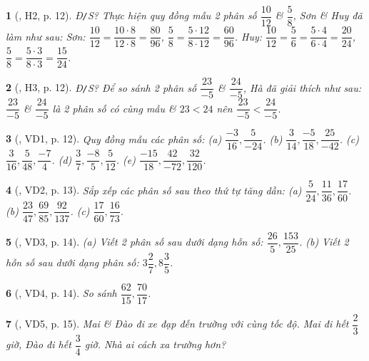 \documentclass{article}
\newtheorem{baitoan}{}
\begin{document}
\begin{baitoan}[\cite{Binh_boi_duong_Toan_6_tap_2}, H2, p. 12]
	{\rm Đ{\tt/}S?} Thực hiện quy đồng mẫu 2 phân số $\dfrac{10}{12}$ \& $\dfrac{5}{8}$, Sơn \& Huy đã làm như sau: Sơn: $\dfrac{10}{12} = \dfrac{10\cdot8}{12\cdot8} = \dfrac{80}{96}$, $\dfrac{5}{8} = \dfrac{5\cdot12}{8\cdot12} = \dfrac{60}{96}$. Huy: $\dfrac{10}{12} = \dfrac{5}{6} = \dfrac{5\cdot4}{6\cdot4} = \dfrac{20}{24}$, $\dfrac{5}{8} = \dfrac{5\cdot3}{8\cdot3} = \dfrac{15}{24}$.
\end{baitoan}

\begin{baitoan}[\cite{Binh_boi_duong_Toan_6_tap_2}, H3, p. 12]
	{\rm Đ{\tt/}S?} Để so sánh 2 phân số $\dfrac{23}{-5}$ \&  $\dfrac{24}{-5}$, Hà đã giải thích như sau: $\dfrac{23}{-5}$ \&  $\dfrac{24}{-5}$ là 2 phân số có cùng mẫu \& $23 < 24$ nên $\dfrac{23}{-5} < \dfrac{24}{-5}$.
\end{baitoan}

\begin{baitoan}[\cite{Binh_boi_duong_Toan_6_tap_2}, VD1, p. 12]
	Quy đồng mẫu các phân số: (a) $\dfrac{-3}{16},\dfrac{5}{-24}$. (b) $\dfrac{3}{14},\dfrac{-5}{18},\dfrac{25}{-42}$. (c) $\dfrac{3}{16},\dfrac{5}{48},\dfrac{-7}{4}$. (d) $\dfrac{3}{7},\dfrac{-8}{5},\dfrac{5}{12}$. (e) $\dfrac{-15}{18},\dfrac{42}{-72},\dfrac{32}{120}$.
\end{baitoan}

\begin{baitoan}[\cite{Binh_boi_duong_Toan_6_tap_2}, VD2, p. 13]
	Sắp xếp các phân số sau theo thứ tự tăng dần: (a) $\dfrac{5}{24},\dfrac{11}{36},\dfrac{17}{60}$. (b) $\dfrac{23}{47},\dfrac{69}{85},\dfrac{92}{137}$. (c) $\dfrac{17}{60},\dfrac{16}{73}$.
\end{baitoan}

\begin{baitoan}[\cite{Binh_boi_duong_Toan_6_tap_2}, VD3, p. 14]
	(a) Viết 2 phân số sau dưới dạng hỗn số: $\dfrac{26}{5},\dfrac{153}{25}$. (b) Viết 2 hỗn số sau dưới dạng phân số: $3\dfrac{2}{7},8\dfrac{3}{5}$.
\end{baitoan}

\begin{baitoan}[\cite{Binh_boi_duong_Toan_6_tap_2}, VD4, p. 14]
	So sánh $\dfrac{62}{15},\dfrac{70}{17}$.
\end{baitoan}

\begin{baitoan}[\cite{Binh_boi_duong_Toan_6_tap_2}, VD5, p. 15]
	Mai \& Đào đi xe đạp đến trường với cùng tốc độ. Mai đi hết $\dfrac{2}{3}$ giờ, Đào đi hết $\dfrac{3}{4}$ giờ. Nhà ai cách xa trường hơn?
\end{baitoan}
\end{document}
